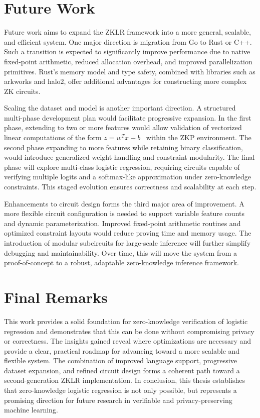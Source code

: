 \section{Future Work}

Future work aims to expand the ZKLR framework into a more general, scalable, and efficient system. One major direction is migration from Go to Rust or C++. Such a transition is expected to significantly improve performance due to native fixed-point arithmetic, reduced allocation overhead, and improved parallelization primitives. Rust’s memory model and type safety, combined with libraries such as arkworks and halo2, offer additional advantages for constructing more complex ZK circuits.

Scaling the dataset and model is another important direction. A structured multi-phase development plan would facilitate progressive expansion. In the first phase, extending to two or more features would allow validation of vectorized linear computations of the form $z = w^T x + b$~ within the ZKP environment. The second phase expanding to more features while retaining binary classification, would introduce generalized weight handling and constraint modularity. The final phase will explore multi-class logistic regression, requiring circuits capable of verifying multiple logits and a softmax-like approximation under zero-knowledge constraints. This staged evolution ensures correctness and scalability at each step.

Enhancements to circuit design forms the third major area of improvement. A more flexible circuit configuration is needed to support variable feature counts and dynamic parameterization. Improved fixed-point arithmetic routines and optimized constraint layouts would reduce proving time and memory usage. The introduction of modular subcircuits for large-scale inference will further simplify debugging and maintainability. Over time, this will move the system from a proof-of-concept to a robust, adaptable zero-knowledge inference framework.

\section{Final Remarks}

This work provides a solid foundation for zero-knowledge verification of logistic regression and demonstrates that this can be done without compromising privacy or correctness. The insights gained reveal where optimizations are necessary and provide a clear, practical roadmap for advancing toward a more scalable and flexible system. The combination of improved language support, progressive dataset expansion, and refined circuit design forms a coherent path toward a second-generation ZKLR implementation. In conclusion, this thesis establishes that zero-knowledge logistic regression is not only possible, but represents a promising direction for future research in verifiable and privacy-preserving machine learning.
